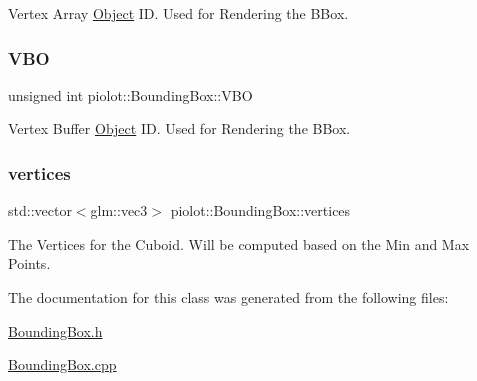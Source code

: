 Vertex Array \mbox{\hyperlink{classpiolot_1_1_object}{Object}} ID. Used for Rendering the B\+Box. 

\mbox{\label{classpiolot_1_1_bounding_box_a4c8c26e00dff9f14709bc2803b38a0bf}} 
\subsubsection{\texorpdfstring{V\+BO}{VBO}}
{\footnotesize\ttfamily unsigned int piolot\+::\+Bounding\+Box\+::\+V\+BO\hspace{0.3cm}{\ttfamily [protected]}}



Vertex Buffer \mbox{\hyperlink{classpiolot_1_1_object}{Object}} ID. Used for Rendering the B\+Box. 

\mbox{\label{classpiolot_1_1_bounding_box_ae57572db987c9f1185ad73febc8fbc28}} 
\subsubsection{\texorpdfstring{vertices}{vertices}}
{\footnotesize\ttfamily std\+::vector$<$glm\+::vec3$>$ piolot\+::\+Bounding\+Box\+::vertices\hspace{0.3cm}{\ttfamily [protected]}}



The Vertices for the Cuboid. Will be computed based on the Min and Max Points. 



The documentation for this class was generated from the following files\+:\begin{DoxyCompactItemize}
\item 
\mbox{\hyperlink{_bounding_box_8h}{Bounding\+Box.\+h}}\item 
\mbox{\hyperlink{_bounding_box_8cpp}{Bounding\+Box.\+cpp}}\end{DoxyCompactItemize}
